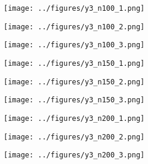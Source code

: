 \begin{otherlanguage}{ngerman}
\begin{samepage}
\begin{minipage}{\textwidth}
\vspace{0.125cm}

\begin{minipage}{0.05\textwidth}\centering{}\end{minipage}%
\begin{minipage}{0.3\textwidth}\centering\texttt{[image: ../figures/y3\_n100\_1.png]}\end{minipage}%
\begin{minipage}{0.3\textwidth}\centering\texttt{[image: ../figures/y3\_n100\_2.png]}\end{minipage}%
\begin{minipage}{0.3\textwidth}\centering\texttt{[image: ../figures/y3\_n100\_3.png]}\end{minipage}

\vspace{0.125cm}

\begin{minipage}{0.05\textwidth}\centering{}\end{minipage}%
\begin{minipage}{0.3\textwidth}\centering\texttt{[image: ../figures/y3\_n150\_1.png]}\end{minipage}%
\begin{minipage}{0.3\textwidth}\centering\texttt{[image: ../figures/y3\_n150\_2.png]}\end{minipage}%
\begin{minipage}{0.3\textwidth}\centering\texttt{[image: ../figures/y3\_n150\_3.png]}\end{minipage}

\vspace{0.125cm}

\begin{minipage}{0.05\textwidth}\centering{}\end{minipage}%
\begin{minipage}{0.3\textwidth}\centering\texttt{[image: ../figures/y3\_n200\_1.png]}\end{minipage}%
\begin{minipage}{0.3\textwidth}\centering\texttt{[image: ../figures/y3\_n200\_2.png]}\end{minipage}%
\begin{minipage}{0.3\textwidth}\centering\texttt{[image: ../figures/y3\_n200\_3.png]}\end{minipage}


\end{minipage}
\end{samepage}
\end{otherlanguage}
